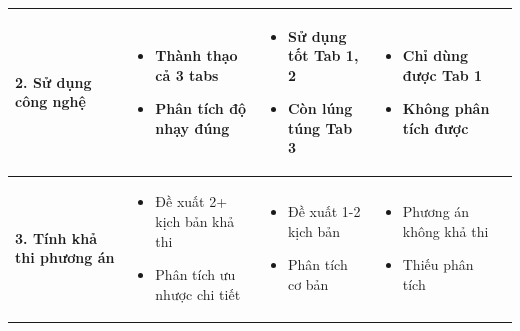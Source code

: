 \documentclass[12pt,a4paper]{article}
\begin{document}
\begin{tabularx}{\textwidth}{|>{\raggedright\arraybackslash}p{2.8cm}|>{\raggedright\arraybackslash}X|>{\raggedright\arraybackslash}X|>{\raggedright\arraybackslash}X|c|}
\textbf{2. Sử dụng công nghệ}
& 
\begin{itemize}[leftmargin=*,noitemsep,topsep=0pt]
    \item Thành thạo cả 3 tabs
    \item Phân tích độ nhạy đúng
\end{itemize}
& 
\begin{itemize}[leftmargin=*,noitemsep,topsep=0pt]
    \item Sử dụng tốt Tab 1, 2
    \item Còn lúng túng Tab 3
\end{itemize}
& 
\begin{itemize}[leftmargin=*,noitemsep,topsep=0pt]
    \item Chỉ dùng được Tab 1
    \item Không phân tích được
\end{itemize}
& \underline{\hspace{1cm}} \\
\hline

\textbf{3. Tính khả thi phương án}
& 
\begin{itemize}[leftmargin=*,noitemsep,topsep=0pt]
    \item Đề xuất 2+ kịch bản khả thi
    \item Phân tích ưu nhược chi tiết
\end{itemize}
& 
\begin{itemize}[leftmargin=*,noitemsep,topsep=0pt]
    \item Đề xuất 1-2 kịch bản
    \item Phân tích cơ bản
\end{itemize}
& 
\begin{itemize}[leftmargin=*,noitemsep,topsep=0pt]
    \item Phương án không khả thi
    \item Thiếu phân tích
\end{itemize}
& \underline{\hspace{1cm}} \\
\hline


\end{tabularx}
\end{document}
